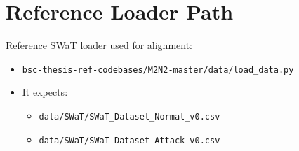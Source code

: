 \documentclass[11pt]{article}
\begin{document}
\section*{Reference Loader Path}
Reference SWaT loader used for alignment:
\begin{itemize}
\item \texttt{bsc-thesis-ref-codebases/M2N2-master/data/load\_data.py}
\item It expects:
\begin{itemize}
\item \texttt{data/SWaT/SWaT\_Dataset\_Normal\_v0.csv}
\item \texttt{data/SWaT/SWaT\_Dataset\_Attack\_v0.csv}
\end{itemize}
\end{itemize}
\end{document}
